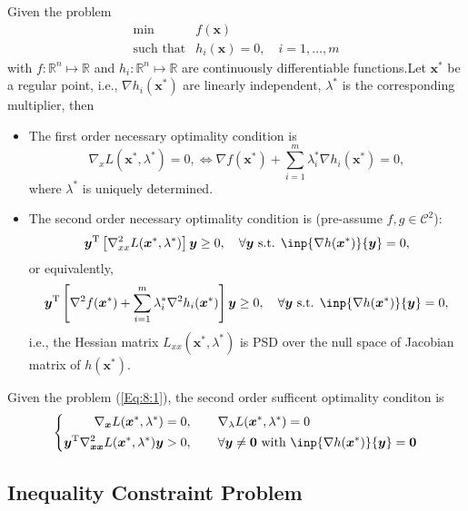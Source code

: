 %
\begin{theorem}
Given the problem
\begin{equation}\label{Eq:8:1}
\begin{array}{ll}
\min&f(\bm x)\\
\mbox{such that}&h_i(\bm x)=0,\quad i=1,\dots,m
\end{array}
\end{equation}
with $f:\mathbb{R}^n\mapsto\mathbb{R}$ and $h_i:\mathbb{R}^n\mapsto\mathbb{R}$ are continuously differentiable functions.Let $\bm x^*$ be a regular point, i.e., $\nabla h_i(\bm x^*)$ are linearly independent, $\lambda^*$ is the corresponding multiplier, then
\begin{itemize}
\item
The first order necessary optimality condition is 
\[
\nabla_x L(\bm x^*,\lambda^*)=0,\Longleftrightarrow
\nabla f(\bm x^*)+\sum_{i=1}^m\lambda_i^*\nabla h_i(\bm x^*)=0,
\]
where $\lambda^*$ is uniquely determined.
\item
The second order necessary optimality condition is (pre-assume $f,g\in\mathcal{C}^2$):
\[
\bm y\trans\left[\nabla_{xx}^2L(\bm x^*,\lambda^*)\right]\bm y\ge0,\quad
\forall\bm y\mbox{ s.t. }\inp{\nabla h(\bm x^*)}{\bm y}=0,
\]
or equivalently,
\[
\bm y\trans\left[\nabla^2f(\bm x^*)+\sum_{i=1}^m\lambda_i^*\nabla^2 h_i(\bm x^*)\right]\bm y\ge0,\quad
\forall\bm y\mbox{ s.t. }\inp{\nabla h(\bm x^*)}{\bm y}=0,
\]
i.e., the Hessian matrix $L_{xx}(\bm x^*,\lambda^*)$ is PSD over the null space of Jacobian matrix of $h(\bm x^*)$.
\end{itemize}

\end{theorem}

\begin{theorem}
Given the problem (\ref{Eq:8:1}), the second order sufficent optimality conditon is
\[
\left\{
\begin{aligned}
\nabla_{\bm x}L(\bm x^*,\lambda^*)&=0,\qquad
\nabla_{\lambda}L(\bm x^*,\lambda^*)=0\\
\bm y\trans\nabla^2_{\bm x\bm x}L(\bm x^*,\lambda^*)\bm y&>0,\qquad\forall\bm y\ne\bm0\mbox{ with }\inp{\nabla h(\bm x^*)}{\bm y}=\bm0
\end{aligned}
\right.
\]

\end{theorem}
\subsection{Inequality Constraint Problem}


